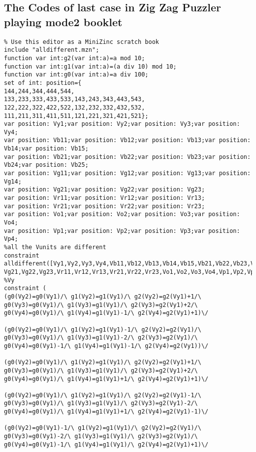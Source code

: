 \begin{appendices}
\section{The Codes of last case in Zig Zag Puzzler playing mode2 booklet}
\label{appendix:lastcaseinmode2}
\begin{lstlisting}
% Use this editor as a MiniZinc scratch book
include "alldifferent.mzn";
function var int:g2(var int:a)=a mod 10;
function var int:g1(var int:a)=(a div 10) mod 10;
function var int:g0(var int:a)=a div 100;
set of int: position={
144,244,344,444,544,
133,233,333,433,533,143,243,343,443,543,
122,222,322,422,522,132,232,332,432,532,
111,211,311,411,511,121,221,321,421,521};
var position: Vy1;var position: Vy2;var position: Vy3;var position: Vy4;
var position: Vb11;var position: Vb12;var position: Vb13;var position: Vb14;var position: Vb15;
var position: Vb21;var position: Vb22;var position: Vb23;var position: Vb24;var position: Vb25;
var position: Vg11;var position: Vg12;var position: Vg13;var position: Vg14;
var position: Vg21;var position: Vg22;var position: Vg23;
var position: Vr11;var position: Vr12;var position: Vr13;
var position: Vr21;var position: Vr22;var position: Vr23;
var position: Vo1;var position: Vo2;var position: Vo3;var position: Vo4;
var position: Vp1;var position: Vp2;var position: Vp3;var position: Vp4;
%all the Vunits are different
constraint alldifferent([Vy1,Vy2,Vy3,Vy4,Vb11,Vb12,Vb13,Vb14,Vb15,Vb21,Vb22,Vb23,Vb24,Vb25,Vg11,Vg12,Vg13,Vg14,
Vg21,Vg22,Vg23,Vr11,Vr12,Vr13,Vr21,Vr22,Vr23,Vo1,Vo2,Vo3,Vo4,Vp1,Vp2,Vp3,Vp4]);
%Vy
constraint (
(g0(Vy2)=g0(Vy1)/\ g1(Vy2)=g1(Vy1)/\ g2(Vy2)=g2(Vy1)+1/\ g0(Vy3)=g0(Vy1)/\ g1(Vy3)=g1(Vy1)/\ g2(Vy3)=g2(Vy1)+2/\ g0(Vy4)=g0(Vy1)/\ g1(Vy4)=g1(Vy1)-1/\ g2(Vy4)=g2(Vy1)+1)\/ 

(g0(Vy2)=g0(Vy1)/\ g1(Vy2)=g1(Vy1)-1/\ g2(Vy2)=g2(Vy1)/\ g0(Vy3)=g0(Vy1)/\ g1(Vy3)=g1(Vy1)-2/\ g2(Vy3)=g2(Vy1)/\ g0(Vy4)=g0(Vy1)-1/\ g1(Vy4)=g1(Vy1)-1/\ g2(Vy4)=g2(Vy1))\/ 

(g0(Vy2)=g0(Vy1)/\ g1(Vy2)=g1(Vy1)/\ g2(Vy2)=g2(Vy1)+1/\ g0(Vy3)=g0(Vy1)/\ g1(Vy3)=g1(Vy1)/\ g2(Vy3)=g2(Vy1)+2/\ g0(Vy4)=g0(Vy1)/\ g1(Vy4)=g1(Vy1)+1/\ g2(Vy4)=g2(Vy1)+1)\/ 

(g0(Vy2)=g0(Vy1)/\ g1(Vy2)=g1(Vy1)/\ g2(Vy2)=g2(Vy1)-1/\ g0(Vy3)=g0(Vy1)/\ g1(Vy3)=g1(Vy1)/\ g2(Vy3)=g2(Vy1)-2/\ g0(Vy4)=g0(Vy1)/\ g1(Vy4)=g1(Vy1)+1/\ g2(Vy4)=g2(Vy1)-1)\/ 

(g0(Vy2)=g0(Vy1)-1/\ g1(Vy2)=g1(Vy1)/\ g2(Vy2)=g2(Vy1)/\ g0(Vy3)=g0(Vy1)-2/\ g1(Vy3)=g1(Vy1)/\ g2(Vy3)=g2(Vy1)/\ g0(Vy4)=g0(Vy1)-1/\ g1(Vy4)=g1(Vy1)/\ g2(Vy4)=g2(Vy1)+1)\/ 


\end{lstlisting}
\end{appendices}
